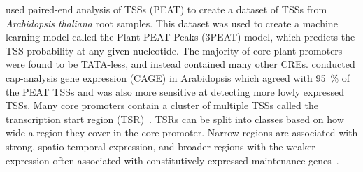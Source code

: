 \documentclass[../main.tex]{subfiles}
\begin{document}
\textcite*{mortonPairedEndAnalysisTranscription2014} used paired\hyp{}end analysis of TSSs (PEAT) to create a dataset of TSSs from \textit{Arabidopsis thaliana} root samples.
This dataset was used to create a machine learning model called the Plant PEAT Peaks (3PEAT) model, which predicts the TSS probability at any given nucleotide. The majority of core plant promoters were found to be TATA\hyp{}less, and instead contained many other CREs.
\textcite*{thieffryCharacterizationArabidopsisThaliana2020} conducted cap\hyp{}analysis gene expression (CAGE) in Arabidopsis which agreed with \SI{95}{\percent} of the PEAT TSSs and was also more sensitive at detecting more lowly expressed TSSs. Many core promoters contain a cluster of multiple TSSs called the transcription start region (TSR)~\autocite{carninciGenomewideAnalysisMammalian2006,rachMotifCompositionConservation2009,niPairedendSequencingStrategy2010}.
TSRs can be split into classes based on how wide a region they cover in the core promoter. Narrow regions are associated with strong, spatio\hyp{}temporal expression, and broader regions with the weaker expression often associated with constitutively expressed maintenance genes~\autocite{mortonPairedEndAnalysisTranscription2014}.
\end{document}
